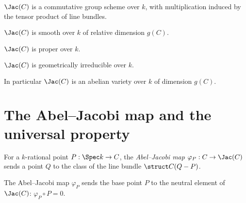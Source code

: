 \begin{proposition}
  \label{prop:jacobian_grpobj}
  \(\Jac(C)\) is a commutative group scheme over \(k\), with multiplication induced by the tensor
  product of line bundles.
\end{proposition}

\begin{theorem}
  \label{thm:jacobian_smooth}
  \(\Jac(C)\) is smooth over \(k\) of relative dimension \(g(C)\).
\end{theorem}

\begin{theorem}
  \label{thm:jacobian_proper}
  \(\Jac(C)\) is proper over \(k\).
\end{theorem}

\begin{theorem}
  \label{thm:jacobian_geomirred}
  \(\Jac(C)\) is geometrically irreducible over \(k\).
\end{theorem}

In particular \(\Jac(C)\) is an abelian variety over \(k\) of dimension \(g(C)\).

\section{The Abel--Jacobi map and the universal property}

\begin{definition}
  \label{def:ofCurve}
  For a \(k\)-rational point \(P : \Spec k \to C\), the \emph{Abel--Jacobi map}
  \(\varphi_P : C \to \Jac(C)\) sends a point \(Q\) to the class of the line bundle
  \(\struct C(Q - P)\).
\end{definition}

\begin{lemma}
  \label{lem:comp_ofCurve}
  The Abel--Jacobi map \(\varphi_P\) sends the base point \(P\) to the neutral element of
  \(\Jac(C)\): \(\varphi_P \circ P = 0\).
\end{lemma}


